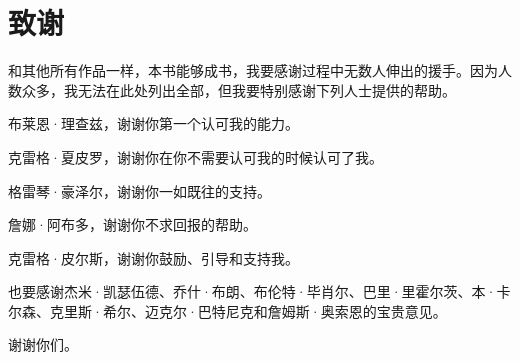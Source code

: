 \section{致谢}

和其他所有作品一样，本书能够成书，我要感谢过程中无数人伸出的援手。因为人数众多，我无法在此处列出全部，但我要特别感谢下列人士提供的帮助。

布莱恩·理查兹，谢谢你第一个认可我的能力。

克雷格·夏皮罗，谢谢你在你不需要认可我的时候认可了我。

格雷琴·豪泽尔，谢谢你一如既往的支持。

詹娜·阿布多，谢谢你不求回报的帮助。

克雷格·皮尔斯，谢谢你鼓励、引导和支持我。

也要感谢杰米·凯瑟伍德、乔什·布朗、布伦特·毕肖尔、巴里·里霍尔茨、本·卡尔森、克里斯·希尔、迈克尔·巴特尼克和詹姆斯·奥索恩的宝贵意见。

谢谢你们。
